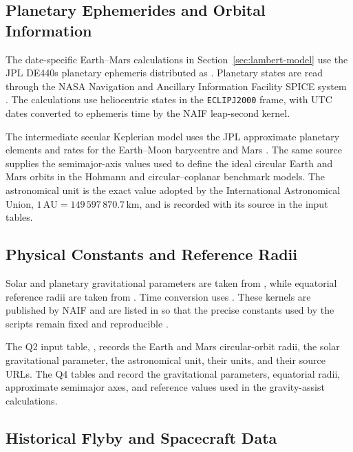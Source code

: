 \documentclass[11pt,a4paper]{article}
\begin{document}
\subsection{Planetary Ephemerides and Orbital Information}

The date-specific Earth--Mars calculations in Section~\ref{sec:lambert-model}
use the JPL DE440s planetary ephemeris distributed as
. Planetary states are read through the
NASA Navigation and Ancillary Information Facility SPICE system
\cite{acton1996,park2021,naifkernels}. The calculations use heliocentric states
in the \texttt{ECLIPJ2000} frame, with UTC dates converted to ephemeris time by
the NAIF leap-second kernel.

The intermediate secular Keplerian model uses the JPL approximate planetary
elements and rates for the Earth--Moon barycentre and Mars
\cite{standish1992,jplapprox}. The same source supplies the semimajor-axis values
used to define the ideal circular Earth and Mars orbits in the Hohmann and
circular--coplanar benchmark models. The astronomical unit is the exact value
adopted by the International Astronomical Union,
\(1\,\mathrm{AU}=149\,597\,870.7\,\mathrm{km}\), and is recorded with its source
in the input tables.

\subsection{Physical Constants and Reference Radii}

Solar and planetary gravitational parameters are taken from
, while equatorial reference radii are
taken from . Time conversion uses
. These kernels are published by NAIF
and are listed in  so that the precise constants
used by the scripts remain fixed and reproducible \cite{naifkernels}.

The Q2 input table, , records the
Earth and Mars circular-orbit radii, the solar gravitational parameter, the
astronomical unit, their units, and their source URLs. The Q4 tables
 and
 record the gravitational
parameters, equatorial radii, approximate semimajor axes, and reference values
used in the gravity-assist calculations.

\subsection{Historical Flyby and Spacecraft Data}
\end{document}
